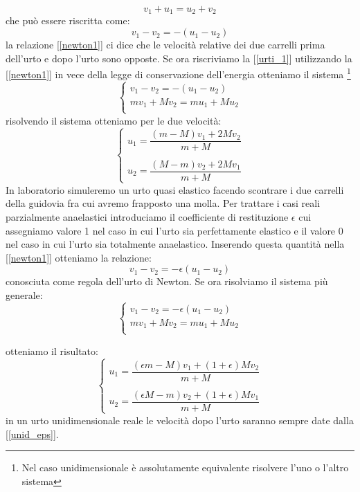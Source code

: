 \documentclass[a4paper,10pt,oneside]{article}
\begin{document}
\begin{equation}
 v_1+u_1=u_2+v_2
\end{equation}
che può essere riscritta come:
\begin{equation}\label{newton1}
 v_1-v_2=-(u_1-u_2)
\end{equation}
la relazione [\ref{newton1}] ci dice che le velocità relative dei due carrelli prima dell'urto e dopo l'urto sono opposte.
Se ora riscriviamo la [\ref{urti_1}] utilizzando la [\ref{newton1}] in vece della legge di conservazione dell'energia otteniamo il sistema \footnote{Nel caso unidimensionale è assolutamente equivalente risolvere l'uno o l'altro sistema}
\begin{equation}
 \begin{cases}
  v_1-v_2=-(u_1-u_2)\\
  mv_1+Mv_2=mu_1+Mu_2\\
 \end{cases}
\end{equation}
risolvendo il sistema otteniamo per le due velocità:
\begin{equation}
 \begin{cases}
    u_1=\dfrac{(m-M)v_1+2Mv_2}{m+M}\\
\\
    u_2=\dfrac{(M-m)v_2+2Mv_1}{m+M}
 \end{cases}
\end{equation}
In laboratorio simuleremo un urto quasi elastico facendo scontrare i due carrelli della guidovia fra cui avremo frapposto una molla.
Per trattare i casi reali parzialmente anaelastici introduciamo il coefficiente di restituzione $\epsilon$ cui assegniamo valore 1 nel caso in cui l'urto sia perfettamente elastico e il valore 0 nel caso in cui l'urto sia totalmente anaelastico. Inserendo questa quantità nella [\ref{newton1}] otteniamo la relazione:
\begin{equation}\label{newton2}
 v_1-v_2=-\epsilon(u_1-u_2)
\end{equation}
conosciuta come regola dell'urto di Newton. Se ora risolviamo il sistema più generale:
\begin{equation}
 \begin{cases}
  v_1-v_2=-\epsilon(u_1-u_2)\\
  mv_1+Mv_2=mu_1+Mu_2\\
 \end{cases}
\end{equation}

otteniamo il risultato:
\begin{equation}\label{unid_eps}
 \begin{cases}
    u_1=\dfrac{(\epsilon m-M)v_1+(1+\epsilon)Mv_2}{m+M}\\
\\
    u_2=\dfrac{(\epsilon M-m)v_2+(1+\epsilon)Mv_1}{m+M}
 \end{cases}
\end{equation}
in un urto unidimensionale reale le velocità dopo l'urto saranno sempre date dalla [\ref{unid_eps}].
\end{document}
